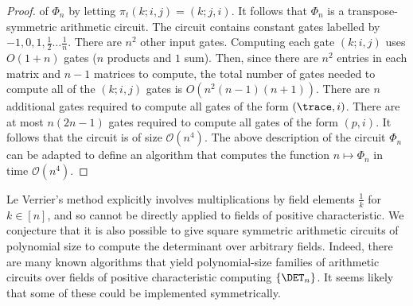 \documentclass[11pt]{article}
\begin{document}
\begin{proof}
  of $\Phi_n$ by letting $\pi_t (k;i,j) = (k;j,i)$. It follows that $\Phi_n$ is
  a transpose-symmetric arithmetic circuit.
  The circuit contains constant gates labelled by $-1, 0, 1, \frac{1}{2} \ldots
  \frac{1}{n}$.  There are $n^2$ other input gates. Computing each gate $(k; i, j)$ uses $O(1+n)$ gates ($n$ products and $1$ sum). Then, since there are $n^2$ entries in each matrix and $n-1$ matrices to compute, the total number of gates needed to compute all of the $(k;i,j)$ gates is $O(n^2 (n-1) (n+1))$. There are $n$ additional gates required to compute all gates of the form $(\trace,
  i)$.  There are at most $n (2n -1)$  gates required to compute all
  gates of the form $(p, i)$. It follows that the circuit is of size
  $\mathcal{O}(n^4)$. The above description of the circuit $\Phi_n$ can be
  adapted to define an algorithm that computes the function $n \mapsto \Phi_n$
  in time $\mathcal{O}(n^4)$.
\end{proof}
Le Verrier's method explicitly involves multiplications by field elements
$\frac{1}{k}$ for $k \in [n]$, and so cannot be directly applied to fields of
positive characteristic. We conjecture that it is also possible to give square
symmetric arithmetic circuits of polynomial size to compute the determinant over
arbitrary fields. Indeed, there are many known algorithms that yield
polynomial-size families of arithmetic circuits over fields of positive
characteristic computing $\{\DET_n\}$. It seems likely that some of these could
be implemented symmetrically.
\end{document}
